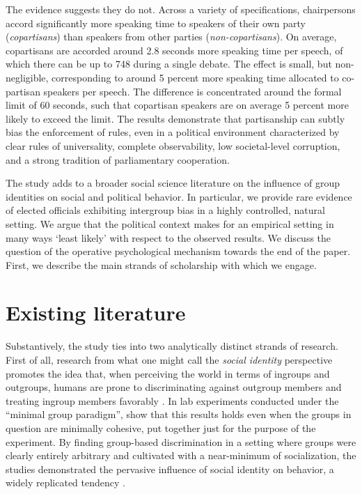 \documentclass[12pt,a4paper]{article}
\begin{document}
The evidence suggests they do not. Across a variety of specifications, chairpersons accord significantly more speaking time to speakers of their own party (\textit{copartisans}) than speakers from other parties (\textit{non-copartisans}). On average, copartisans are accorded around 2.8 seconds more speaking time per speech, of which there can be up to 748 during a single debate. The effect is small, but non-negligible, corresponding to around 5 percent more speaking time allocated to co-partisan speakers per speech. The difference is concentrated around the formal limit of 60 seconds, such that copartisan speakers are on average 5 percent more likely to exceed the limit. The results demonstrate that partisanship can subtly bias the enforcement of rules, even in a political environment characterized by clear rules of universality, complete observability, low societal-level corruption, and a strong tradition of parliamentary cooperation.

The study adds to a broader social science literature on the influence of group identities on social and political behavior. In particular, we provide rare evidence of elected officials exhibiting intergroup bias in a highly controlled, natural setting. We argue that the political context makes for an empirical setting in many ways `least likely' with respect to the observed results. We discuss the question of the operative psychological mechanism towards the end of the paper. First, we describe the main strands of scholarship with which we engage. 

\section{Existing literature}

Substantively, the study ties into two analytically distinct strands of research. First of all, research from what one might call the \textit{social identity} perspective promotes the idea that, when perceiving the world in terms of ingroups and outgroups, humans are prone to discriminating against outgroup members and treating ingroup members favorably \citep{Hewstone2002}. In lab experiments conducted under the ``minimal group paradigm'', \cite{Tajfel1979,Tajfel1986} show that this results holds even when the groups in question are minimally cohesive, put together just for the purpose of the experiment. By finding group-based discrimination in a setting where groups were clearly entirely arbitrary and cultivated with a near-minimum of socialization, the studies demonstrated the pervasive influence of social identity on behavior, a widely replicated tendency \citep{Brewer1979, Abrams1990, Brown2000, Chen2009}. 
\end{document}
